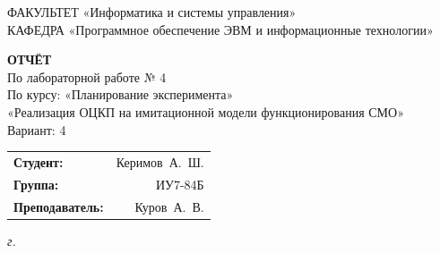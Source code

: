 \begin{titlepage}
	{\doublespacing\small\raggedright
		ФАКУЛЬТЕТ \hspace{28mm} «Информатика и системы управления» \\
		КАФЕДРА \hspace{9mm} «Программное обеспечение ЭВМ и информационные технологии» \\
	}

	\vspace{30mm}

	\textbf{ОТЧЁТ} \\
	По лабораторной работе № 4 \\
	По курсу: «Планирование эксперимента» \\
	«Реализация ОЦКП на имитационной модели функционирования СМО» \\
	Вариант: 4

	\vspace{40mm}

	\begin{flushleft}
		\begin{tabular}{lr}
			\textbf{Студент:}        & Керимов~А.~Ш. \\
			\textbf{Группа:}         & ИУ7-84Б       \\
			\textbf{Преподаватель:}  & Куров~А.~В.   \\
		\end{tabular}
	\end{flushleft}

	\vfill

	\textit{{\the\year} г.}
\end{titlepage}

\setcounter{page}{2}
